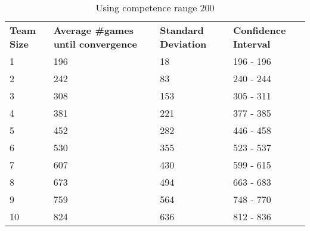\documentclass[12pt]{article}
\begin{document}
\begin{table}[!htb]
	\centering
	\caption{Using competence range 200}
	\begin{tabular}{llll}
		\textbf{Team Size} & \textbf{Average \#games until convergence} & \textbf{Standard Deviation} & \textbf{Confidence Interval} \\
		1                  & 196              & 18                          & 196 - 196                    \\
		2                  & 242              & 83                          & 240 - 244                    \\
		3                  & 308              & 153                         & 305 - 311                    \\
		4                  & 381              & 221                         & 377 - 385                    \\
		5                  & 452              & 282                         & 446 - 458                    \\
		6                  & 530              & 355                         & 523 - 537                    \\
		7                  & 607              & 430                         & 599 - 615                    \\
		8                  & 673              & 494                         & 663 - 683                    \\
		9                  & 759              & 564                         & 748 - 770                    \\
		10                 & 824              & 636                         & 812 - 836                   
	\end{tabular}
\end{table}
\end{document}

